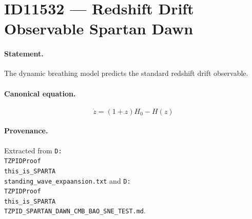 \section*{ID11532 --- Redshift Drift Observable Spartan Dawn}

\paragraph{Statement.}
The dynamic breathing model predicts the standard redshift drift observable.

\paragraph{Canonical equation.}
\[
\dot z=(1+z)H_0-H(z)
\]

\paragraph{Provenance.}
Extracted from \texttt{D:\\TZPIDProof\\this\_is\_SPARTA\\standing\_wave\_expaansion.txt} and \texttt{D:\\TZPIDProof\\this\_is\_SPARTA\\TZPID\_SPARTAN\_DAWN\_CMB\_BAO\_SNE\_TEST.md}.

